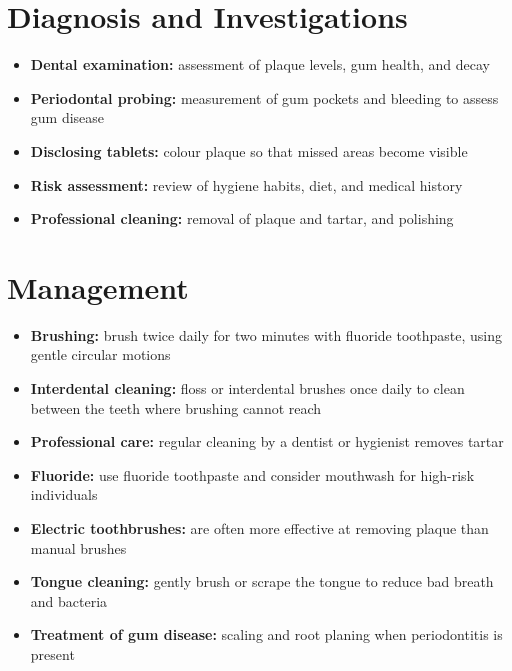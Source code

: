 \section*{Diagnosis and Investigations}
\begin{itemize}
    \item \textbf{Dental examination:} assessment of plaque levels, gum health, and decay
    \item \textbf{Periodontal probing:} measurement of gum pockets and bleeding to assess gum disease
    \item \textbf{Disclosing tablets:} colour plaque so that missed areas become visible
    \item \textbf{Risk assessment:} review of hygiene habits, diet, and medical history
    \item \textbf{Professional cleaning:} removal of plaque and tartar, and polishing
\end{itemize}

\section*{Management}
\begin{itemize}
    \item \textbf{Brushing:} brush twice daily for two minutes with fluoride toothpaste, using gentle circular motions
    \item \textbf{Interdental cleaning:} floss or interdental brushes once daily to clean between the teeth where brushing cannot reach
    \item \textbf{Professional care:} regular cleaning by a dentist or hygienist removes tartar
    \item \textbf{Fluoride:} use fluoride toothpaste and consider mouthwash for high-risk individuals
    \item \textbf{Electric toothbrushes:} are often more effective at removing plaque than manual brushes
    \item \textbf{Tongue cleaning:} gently brush or scrape the tongue to reduce bad breath and bacteria
    \item \textbf{Treatment of gum disease:} scaling and root planing when periodontitis is present
\end{itemize}

